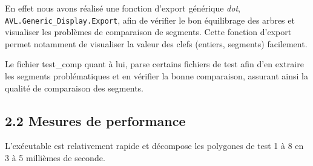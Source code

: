 \documentclass [a4paper,11pt] {report}
\begin{document}
En effet nous avons réalisé une fonction d'export générique \textit{dot}, \lstinline!AVL.Generic_Display.Export!, afin de vérifier le bon équilibrage des arbres et visualiser les problèmes de comparaison de segments.
Cette fonction d'export permet notamment de visualiser la valeur des clefs (entiers, segments) facilement.


Le fichier test\_comp quant à lui, parse certains fichiers de test afin d'en extraire les segments problématiques et en vérifier la bonne comparaison, assurant ainsi la qualité de comparaison des segments.




\subsection* {2.2\hspace{3mm} Mesures de performance}

L'exécutable est relativement rapide et décompose les polygones de test 1 à 8 en 3 à 5 millièmes de seconde.
\end{document}
